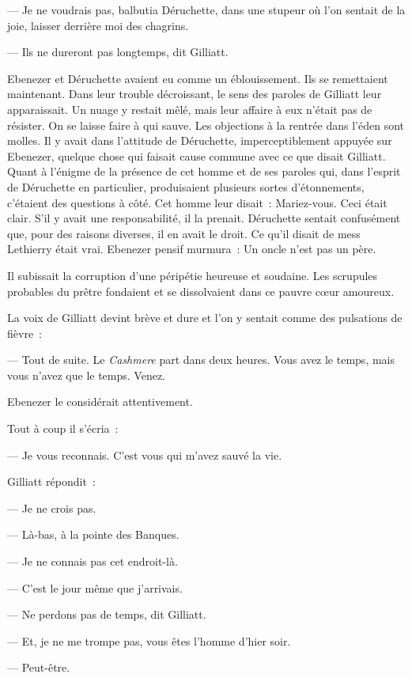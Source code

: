 \documentclass[french,twoside]{book} %
\begin{document}
— Je ne voudrais pas, balbutia Déruchette, dans une stupeur où l’on sentait de la joie, laisser derrière moi des chagrins.\par
— Ils ne dureront pas longtemps, dit Gilliatt.\par
Ebenezer et Déruchette avaient eu comme un éblouissement. Ils se remettaient maintenant. Dans leur trouble décroissant, le sens des paroles de Gilliatt leur apparaissait. Un nuage y restait mêlé, mais leur affaire à eux n’était pas de résister. On se laisse faire à qui sauve. Les objections à la rentrée dans l’éden sont molles. Il y avait dans l’attitude de Déruchette, imperceptiblement appuyée sur Ebenezer, quelque chose qui faisait cause commune avec ce que disait Gilliatt. Quant à l’énigme de la présence de cet homme et de ses paroles qui, dans l’esprit de Déruchette en particulier, produisaient plusieurs sortes d’étonnements, c’étaient des questions à côté. Cet homme leur disait : Mariez-vous. Ceci était clair. S’il y avait une  responsabilité, il la prenait. Déruchette sentait confusément que, pour des raisons diverses, il en avait le droit. Ce qu’il disait de mess Lethierry était vrai. Ebenezer pensif murmura : Un oncle n’est pas un père.\par
Il subissait la corruption d’une péripétie heureuse et soudaine. Les scrupules probables du prêtre fondaient et se dissolvaient dans ce pauvre cœur amoureux.\par
La voix de Gilliatt devint brève et dure et l’on y sentait comme des pulsations de fièvre :\par
— Tout de suite. Le \emph{Cashmere} part dans deux heures. Vous avez le temps, mais vous n’avez que le temps. Venez.\par
Ebenezer le considérait attentivement.\par
Tout à coup il s’écria :\par
— Je vous reconnais. C’est vous qui m’avez sauvé la vie.\par
Gilliatt répondit :\par
— Je ne crois pas.\par
— Là-bas, à la pointe des Banques.\par
— Je ne connais pas cet endroit-là.\par
— C’est le jour même que j’arrivais.\par
— Ne perdons pas de temps, dit Gilliatt.\par
— Et, je ne me trompe pas, vous êtes l’homme d’hier soir.\par
— Peut-être.\par
\end{document}
